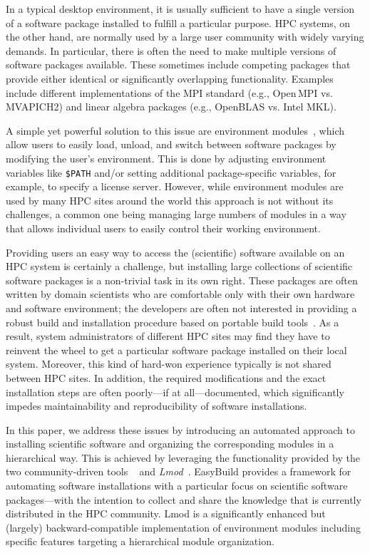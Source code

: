 In a typical desktop environment, it is usually sufficient to have a
single version of a software package installed to fulfill a particular purpose. HPC
systems, on the other hand, are normally used by a large user community with widely varying
demands. In particular, there is often the need to make multiple versions of
software packages available. These sometimes include competing packages
that provide either identical or significantly overlapping functionality. Examples include
 different implementations of the MPI standard (e.g., Open\,MPI vs.
MVAPICH2) and linear algebra packages (e.g., OpenBLAS vs. Intel MKL).

A simple yet powerful solution to this issue are environment
modules~\cite{furlani91,furlani96,eadline,laytonEM1}, which allow
users to easily load, unload, and switch between software packages by
modifying the user's environment. This is done by adjusting environment
variables like \texttt{\small\$PATH} and/or setting additional package-specific
variables, for example, to specify a license server.
However, while environment modules are used by many
HPC sites around the world this approach is not without its challenges,
a common one being managing large numbers of modules in a way that allows individual
users to easily control their working environment.

Providing users an easy way to access the (scientific) software
available on an HPC system is certainly a challenge, but installing large collections
of scientific software packages is a
non-trivial task in its own right. These packages are often written by domain
scientists who are comfortable only with their own hardware and software
environment; the developers are often not interested in providing a robust
build and installation procedure based on portable build
tools~\cite{Dubois03}. As a result, system administrators of different HPC sites may
find they have to reinvent the wheel to
get a particular software package installed on their local system. Moreover, this
kind of hard-won experience typically is not shared between HPC sites. In
addition, the required modifications and the exact installation steps are
often poorly---if at all---documented, which significantly impedes
maintainability and reproducibility of software installations.

In this paper, we address these issues by introducing an automated approach to
installing scientific software and organizing the corresponding modules in a
hierarchical way. This is achieved by leveraging the functionality provided by the
two community-driven tools \emph{\easybuild{}}~\cite{EasyBuildSC12} and
\emph{Lmod}~\cite{taccLmod}. EasyBuild provides a
framework for automating software installations with a particular focus on
scientific software packages---with the intention to collect and share the
knowledge that is currently distributed in the HPC community.
Lmod is a significantly enhanced but
(largely) backward-compatible implementation of environment modules including specific
features targeting a hierarchical module organization.

